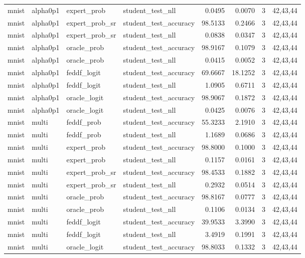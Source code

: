 \begin{tabular}{llllrrrl}
mnist & alpha0p1 & expert\_prob & student\_test\_nll & 0.0495 & 0.0070 & 3 & 42,43,44 \\
mnist & alpha0p1 & expert\_prob\_sr & student\_test\_accuracy & 98.5133 & 0.2466 & 3 & 42,43,44 \\
mnist & alpha0p1 & expert\_prob\_sr & student\_test\_nll & 0.0838 & 0.0347 & 3 & 42,43,44 \\
mnist & alpha0p1 & oracle\_prob & student\_test\_accuracy & 98.9167 & 0.1079 & 3 & 42,43,44 \\
mnist & alpha0p1 & oracle\_prob & student\_test\_nll & 0.0415 & 0.0052 & 3 & 42,43,44 \\
mnist & alpha0p1 & feddf\_logit & student\_test\_accuracy & 69.6667 & 18.1252 & 3 & 42,43,44 \\
mnist & alpha0p1 & feddf\_logit & student\_test\_nll & 1.0905 & 0.6711 & 3 & 42,43,44 \\
mnist & alpha0p1 & oracle\_logit & student\_test\_accuracy & 98.9067 & 0.1872 & 3 & 42,43,44 \\
mnist & alpha0p1 & oracle\_logit & student\_test\_nll & 0.0425 & 0.0076 & 3 & 42,43,44 \\
mnist & multi & feddf\_prob & student\_test\_accuracy & 55.3233 & 2.1910 & 3 & 42,43,44 \\
mnist & multi & feddf\_prob & student\_test\_nll & 1.1689 & 0.0686 & 3 & 42,43,44 \\
mnist & multi & expert\_prob & student\_test\_accuracy & 98.8000 & 0.1000 & 3 & 42,43,44 \\
mnist & multi & expert\_prob & student\_test\_nll & 0.1157 & 0.0161 & 3 & 42,43,44 \\
mnist & multi & expert\_prob\_sr & student\_test\_accuracy & 98.4533 & 0.1882 & 3 & 42,43,44 \\
mnist & multi & expert\_prob\_sr & student\_test\_nll & 0.2932 & 0.0514 & 3 & 42,43,44 \\
mnist & multi & oracle\_prob & student\_test\_accuracy & 98.8167 & 0.0777 & 3 & 42,43,44 \\
mnist & multi & oracle\_prob & student\_test\_nll & 0.1106 & 0.0134 & 3 & 42,43,44 \\
mnist & multi & feddf\_logit & student\_test\_accuracy & 39.9533 & 3.3990 & 3 & 42,43,44 \\
mnist & multi & feddf\_logit & student\_test\_nll & 3.4919 & 0.1991 & 3 & 42,43,44 \\
mnist & multi & oracle\_logit & student\_test\_accuracy & 98.8033 & 0.1332 & 3 & 42,43,44 \\

\end{tabular}
